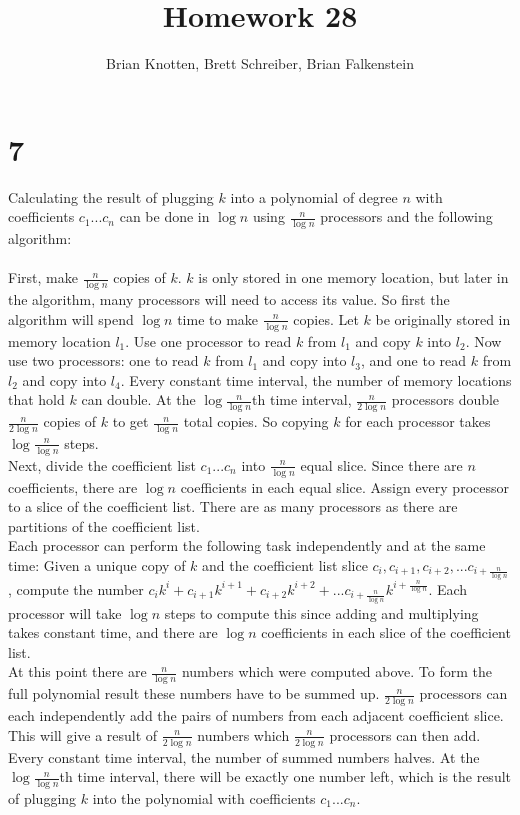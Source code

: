 \documentclass[letterpaper,notitlepage,twoside]{article}
\begin{document}
\title{Homework 28}
\author{Brian Knotten, Brett Schreiber, Brian Falkenstein}
\maketitle
\section*{7}
Calculating the result of plugging $k$ into a polynomial of degree $n$ with coefficients $c_1...c_n$ can be done in $\log n$ using $\frac{n}{\log n}$ processors and the following algorithm:
\\\\
First, make $\frac{n}{\log n}$ copies of $k$. $k$ is only stored in one memory location, but later in the algorithm, many processors will need to access its value. So first the algorithm will spend $\log n$ time to make $\frac{n}{\log n}$ copies. Let $k$ be originally stored in memory location $l_1$. Use one processor to read $k$ from $l_1$ and copy $k$ into $l_2$. Now use two processors: one to read $k$ from $l_1$ and copy into $l_3$, and one to read $k$ from $l_2$ and copy into $l_4$. Every constant time interval, the number of memory locations that hold $k$ can double. At the $\log \frac{n}{\log n}$th time interval, $\frac{n}{2 \log n}$ processors double $\frac{n}{2 \log n}$ copies of $k$ to get $\frac{n}{\log n}$ total copies. So copying $k$ for each processor takes $\log \frac{n}{\log n}$ steps.
\\
Next, divide the coefficient list $c_1...c_n$ into $\frac{n}{\log n}$ equal slice. Since there are $n$ coefficients, there are $\log{n}$ coefficients in each equal slice. Assign every processor to a slice of the coefficient list. There are as many processors as there are partitions of the coefficient list.
\\
Each processor can perform the following task independently and at the same time: Given a unique copy of $k$ and the coefficient list slice $c_i, c_{i + 1}, c_{i + 2}, ... c_{i + \frac{n}{\log n}}$, compute the number $c_ik^i + c_{i + 1}k^{i + 1} + c_{i + 2}k^{i + 2} + ... c_{i + \frac{n}{\log n}}k^{i + \frac{n}{\log n}}$. Each processor will take $\log n$ steps to compute this since adding and multiplying takes constant time, and there are $\log n$ coefficients in each slice of the coefficient list.
\\
At this point there are $\frac{n}{\log n}$ numbers which were computed above. To form the full polynomial result these numbers have to be summed up. $\frac{n}{2 \log n}$ processors can each independently add the pairs of numbers from each adjacent coefficient slice. This will give a result of $\frac{n}{2 \log n}$ numbers which $\frac{n}{2 \log n}$ processors can then add. Every constant time interval, the number of summed numbers halves. At the $\log \frac{n}{\log n}$th time interval, there will be exactly one number left, which is the result of plugging $k$ into the polynomial with coefficients $c_1...c_n$.
\end{document}
